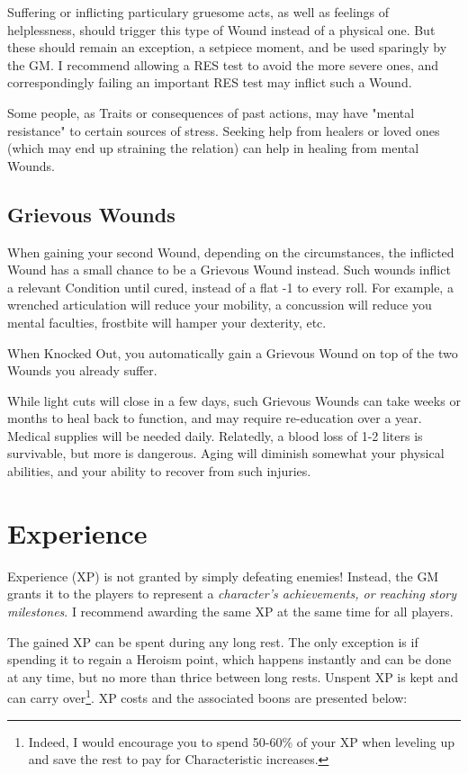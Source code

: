 Suffering or inflicting particulary gruesome acts, as well as feelings of helplessness, should trigger this type of Wound instead of a physical one. But these should remain an exception, a setpiece moment, and be used sparingly by the GM. I recommend allowing a RES test to avoid the more severe ones, and correspondingly failing an important RES test may inflict such a Wound.

Some people, as Traits or consequences of past actions, may have "mental resistance" to certain sources of stress. Seeking help from healers or loved ones (which may end up straining the relation) can help in healing from mental Wounds.


\subsection{Grievous Wounds}

When gaining your second Wound, depending on the circumstances, the inflicted Wound has a small chance to be a Grievous Wound instead. Such wounds inflict a relevant Condition until cured, instead of a flat -1 to every roll. For example, a wrenched articulation will reduce your mobility, a concussion will reduce you mental faculties, frostbite will hamper your dexterity, etc.

When Knocked Out, you automatically gain a Grievous Wound on top of the two Wounds you already suffer.

While light cuts will close in a few days, such Grievous Wounds can take weeks or months to heal back to function, and may require re-education over a year. Medical supplies will be needed daily. Relatedly, a blood loss of 1-2 liters is survivable, but more is dangerous. Aging will diminish somewhat your physical abilities, and your ability to recover from such injuries.

\section{Experience}

\label{experience}

Experience (XP) is not granted by simply defeating enemies! Instead, the GM grants it to the players to represent a \textit{character's achievements, or reaching story milestones}. I recommend awarding the same XP at the same time for all players.

The gained XP can be spent during any long rest. The only exception is if spending it to regain a Heroism point, which happens instantly and can be done at any time, but no more than thrice between long rests. Unspent XP is kept and can carry over\footnote{Indeed, I would encourage you to spend 50-60\% of your XP when leveling up and save the rest to pay for Characteristic increases.}. XP costs and the associated boons are presented below:

